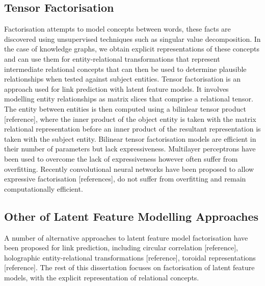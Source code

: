 \subsection{Tensor Factorisation}
Factorisation attempts to model concepts between words, these facts are discovered using unsupervised techniques such as singular value decomposition. In the case of knowledge graphs, we obtain explicit representations of these concepts and can use them for entity-relational transformations that represent intermediate relational concepts that can then be used to determine plausible relationships when tested against subject entities.
Tensor factorisation is an approach used for link prediction with latent feature models. It involves modelling entity relationships as matrix slices that comprise a relational tensor. The entity between entities is then computed using a bilinlear tensor product [reference], where the inner product of the object entity is taken with the matrix relational representation before an inner product of the resultant representation is taken with the subject entity. Bilinear tensor factorisation models are efficient in their number of parameters but lack expressiveness. Multilayer perceptrons have been used to overcome the lack of expressiveness however often suffer from overfitting. Recently convolutional neural networks have been proposed to allow expressive factorisation [references], do not suffer from overfitting and remain computationally efficient. \newline
\subsection{Other of Latent Feature Modelling Approaches}
A number of alternative approaches to latent feature model factorisation have been proposed for link prediction, including circular correlation [reference], holographic entity-relational transformations [reference], toroidal representations [reference]. The rest of this dissertation focuses on factorisation of latent feature models, with the explicit representation of relational concepts. \newline

